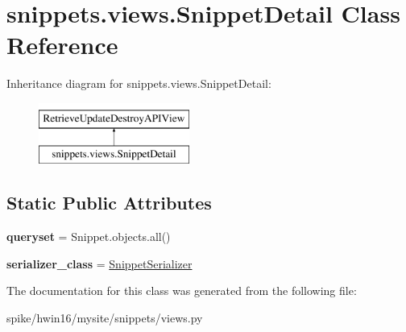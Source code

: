 \hypertarget{classsnippets_1_1views_1_1_snippet_detail}{}\section{snippets.\+views.\+Snippet\+Detail Class Reference}
\label{classsnippets_1_1views_1_1_snippet_detail}
Inheritance diagram for snippets.\+views.\+Snippet\+Detail\+:\begin{figure}[H]
\begin{center}
\leavevmode
\includegraphics[height=2.000000cm]{classsnippets_1_1views_1_1_snippet_detail}
\end{center}
\end{figure}
\subsection*{Static Public Attributes}
\begin{DoxyCompactItemize}
\item 
\mbox{\label{classsnippets_1_1views_1_1_snippet_detail_a9dfbcfb6881bf052630041ce0436d9cc}} 
{\bfseries queryset} = Snippet.\+objects.\+all()
\item 
\mbox{\label{classsnippets_1_1views_1_1_snippet_detail_aae643773a00409d96ce42878ed18d6f0}} 
{\bfseries serializer\+\_\+class} = \mbox{\hyperlink{classsnippets_1_1serializers_1_1_snippet_serializer}{Snippet\+Serializer}}
\end{DoxyCompactItemize}


The documentation for this class was generated from the following file\+:\begin{DoxyCompactItemize}
\item 
spike/hwin16/mysite/snippets/views.\+py\end{DoxyCompactItemize}
